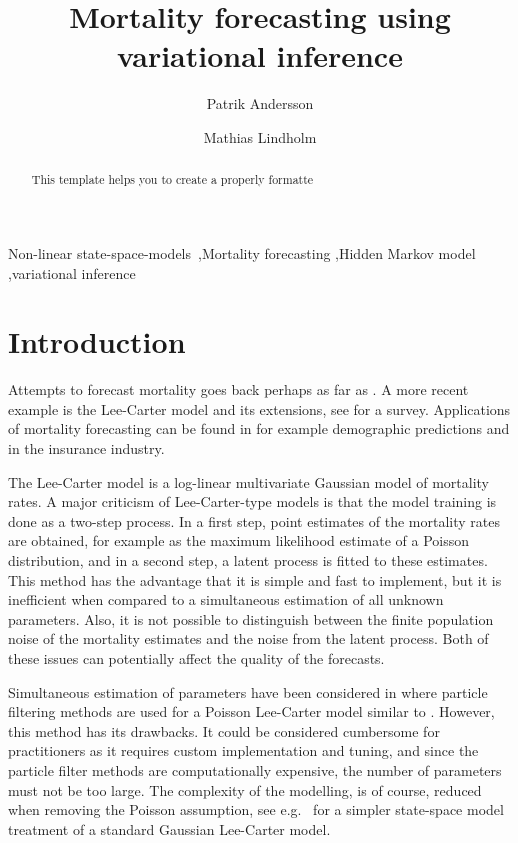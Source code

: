 \documentclass[preprint,12pt]{elsarticle}
\begin{document}
\begin{frontmatter}

\title{Mortality forecasting using variational inference}
\author{Patrik Andersson}
\address{Uppsala University}
\author{Mathias Lindholm}
\address{Stockholm University}

\begin{abstract}
This template helps you to create a properly formatte
\end{abstract}

\begin{keyword}
Non-linear state-space-models \sep Mortality forecasting \sep Hidden Markov model \sep variational inference
\end{keyword}

\end{frontmatter}

\linenumbers

\section{Introduction}
Attempts to forecast mortality goes back perhaps as far as \cite{gompertz1825nature}. A more recent example is the Lee-Carter model \citep{lee1992modeling} and its extensions, see \cite{booth2008mortality, haberman2011comparative, carfora2017quantitative} for a survey. Applications of mortality forecasting can be found in for example demographic predictions and in the insurance industry.

The Lee-Carter model is a log-linear multivariate Gaussian model of mortality rates. A major criticism of Lee-Carter-type models is that the model training is done as a two-step process. In a first step, point estimates of the mortality rates are obtained, for example as the maximum likelihood estimate of a Poisson distribution, and in a second step, a latent process is fitted to these estimates. This method has the advantage that it is simple and fast to implement, but it is inefficient when compared to a simultaneous estimation of all unknown parameters. Also, it is not possible to distinguish between the finite population noise of the mortality estimates and the noise from the latent process. Both of these issues can potentially affect the quality of the forecasts. 

Simultaneous estimation of parameters have been considered in \cite{andersson2020mortality} where particle filtering methods are used for a Poisson Lee-Carter model similar to \cite{brouhns2002poisson}. However, this method has its drawbacks. It could be considered cumbersome for practitioners as it requires custom implementation and tuning, and since the particle filter methods are computationally expensive, the number of parameters must not be too large. The complexity of the modelling, is of course, reduced when removing the Poisson assumption, see e.g.\ \cite{de2006extending} for a simpler state-space model treatment of a standard Gaussian Lee-Carter model.
\end{document}
